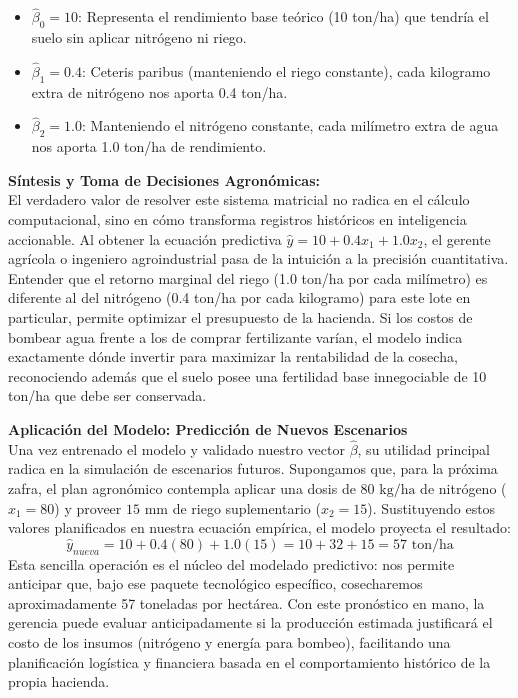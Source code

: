 \documentclass{article}
\begin{document}
\begin{itemize}
    \item $\hat{\beta}_0 = 10$: Representa el rendimiento base teórico (10 ton/ha) que tendría el suelo sin aplicar nitrógeno ni riego.
    \item $\hat{\beta}_1 = 0.4$: Ceteris paribus (manteniendo el riego constante), cada kilogramo extra de nitrógeno nos aporta 0.4 ton/ha.
    \item $\hat{\beta}_2 = 1.0$: Manteniendo el nitrógeno constante, cada milímetro extra de agua nos aporta 1.0 ton/ha de rendimiento.
\end{itemize}

\textbf{Síntesis y Toma de Decisiones Agronómicas:} \\
El verdadero valor de resolver este sistema matricial no radica en el cálculo computacional, sino en cómo transforma registros históricos en inteligencia accionable. Al obtener la ecuación predictiva $\hat{y} = 10 + 0.4x_1 + 1.0x_2$, el gerente agrícola o ingeniero agroindustrial pasa de la intuición a la precisión cuantitativa. Entender que el retorno marginal del riego (1.0 ton/ha por cada milímetro) es diferente al del nitrógeno (0.4 ton/ha por cada kilogramo) para este lote en particular, permite optimizar el presupuesto de la hacienda. Si los costos de bombear agua frente a los de comprar fertilizante varían, el modelo indica exactamente dónde invertir para maximizar la rentabilidad de la cosecha, reconociendo además que el suelo posee una fertilidad base innegociable de 10 ton/ha que debe ser conservada.

\textbf{Aplicación del Modelo: Predicción de Nuevos Escenarios} \\
Una vez entrenado el modelo y validado nuestro vector $\hat{\beta}$, su utilidad principal radica en la simulación de escenarios futuros. Supongamos que, para la próxima zafra, el plan agronómico contempla aplicar una dosis de $80 \text{ kg/ha}$ de nitrógeno ($x_1 = 80$) y proveer $15 \text{ mm}$ de riego suplementario ($x_2 = 15$). Sustituyendo estos valores planificados en nuestra ecuación empírica, el modelo proyecta el resultado:
$$ \hat{y}_{nueva} = 10 + 0.4(80) + 1.0(15) = 10 + 32 + 15 = 57 \text{ ton/ha} $$
Esta sencilla operación es el núcleo del modelado predictivo: nos permite anticipar que, bajo ese paquete tecnológico específico, cosecharemos aproximadamente 57 toneladas por hectárea. Con este pronóstico en mano, la gerencia puede evaluar anticipadamente si la producción estimada justificará el costo de los insumos (nitrógeno y energía para bombeo), facilitando una planificación logística y financiera basada en el comportamiento histórico de la propia hacienda.
\end{document}
